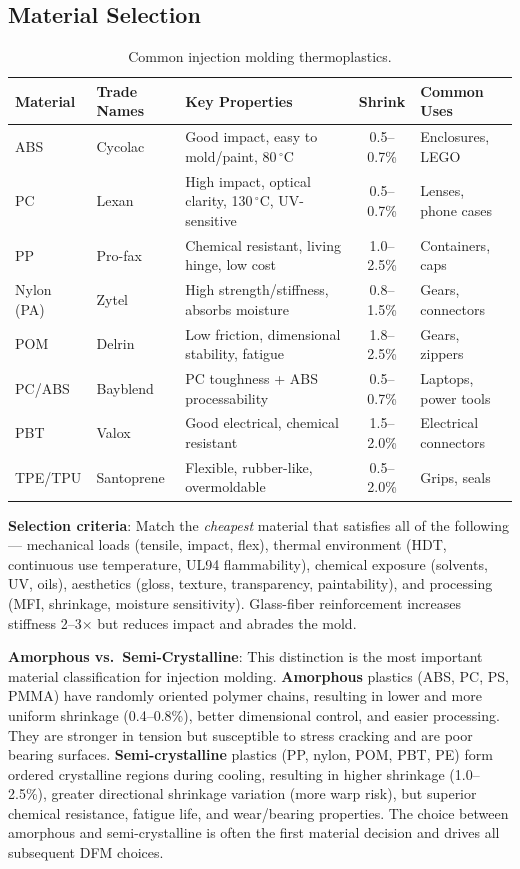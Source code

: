 \documentclass[11pt,letterpaper,twoside,openany]{book}
\newcommand{\degC}{\ensuremath{{}^{\circ}\text{C}}}
\begin{document}
\subsection{Material Selection}
\label{sec:materials}

\begin{table}[ht!]
\centering\small
\begin{tabularx}{\textwidth}{l l X c l}
  \toprule
  \textbf{Material} & \textbf{Trade Names} & \textbf{Key Properties} & \textbf{Shrink} & \textbf{Common Uses} \\
  \midrule
  ABS & Cycolac & Good impact, easy to mold/paint, 80\,\degC & 0.5--0.7\% & Enclosures, LEGO \\
  PC & Lexan & High impact, optical clarity, 130\,\degC, UV-sensitive & 0.5--0.7\% & Lenses, phone cases \\
  PP & Pro-fax & Chemical resistant, living hinge, low cost & 1.0--2.5\% & Containers, caps \\
  Nylon (PA) & Zytel & High strength/stiffness, absorbs moisture & 0.8--1.5\% & Gears, connectors \\
  POM & Delrin & Low friction, dimensional stability, fatigue & 1.8--2.5\% & Gears, zippers \\
  PC/ABS & Bayblend & PC toughness + ABS processability & 0.5--0.7\% & Laptops, power tools \\
  PBT & Valox & Good electrical, chemical resistant & 1.5--2.0\% & Electrical connectors \\
  TPE/TPU & Santoprene & Flexible, rubber-like, overmoldable & 0.5--2.0\% & Grips, seals \\
  \bottomrule
\end{tabularx}
\caption{Common injection molding thermoplastics.}
\end{table}

\textbf{Selection criteria}: Match the \emph{cheapest} material that satisfies all of the following --- mechanical loads (tensile, impact, flex), thermal environment (HDT, continuous use temperature, UL94 flammability), chemical exposure (solvents, UV, oils), aesthetics (gloss, texture, transparency, paintability), and processing (MFI, shrinkage, moisture sensitivity). Glass-fiber reinforcement increases stiffness 2--3$\times$ but reduces impact and abrades the mold.

\textbf{Amorphous vs.\ Semi-Crystalline}: This distinction is the most important material classification for injection molding. \textbf{Amorphous} plastics (ABS, PC, PS, PMMA) have randomly oriented polymer chains, resulting in lower and more uniform shrinkage (0.4--0.8\%), better dimensional control, and easier processing. They are stronger in tension but susceptible to stress cracking and are poor bearing surfaces. \textbf{Semi-crystalline} plastics (PP, nylon, POM, PBT, PE) form ordered crystalline regions during cooling, resulting in higher shrinkage (1.0--2.5\%), greater directional shrinkage variation (more warp risk), but superior chemical resistance, fatigue life, and wear/bearing properties. The choice between amorphous and semi-crystalline is often the first material decision and drives all subsequent DFM choices.
\end{document}
